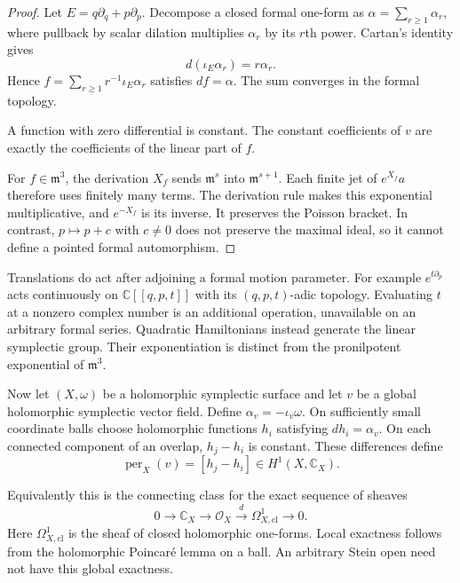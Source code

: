 \begin{proof}
Let $E=q\partial_q+p\partial_p$. Decompose a closed formal one-form
as $\alpha=\sum_{r\geq1}\alpha_r$, where pullback by scalar dilation
multiplies $\alpha_r$ by its $r$th power. Cartan's identity gives
\[
 d(\iota_E\alpha_r)=r\alpha_r.
\]
Hence $f=\sum_{r\geq1}r^{-1}\iota_E\alpha_r$ satisfies $df=\alpha$.
The sum converges in the formal topology.

A function with zero
differential is constant.
The constant coefficients of $v$ are
exactly the coefficients of the linear part of $f$.

For $f\in\mathfrak m^3$, the derivation $X_f$ sends
$\mathfrak m^s$ into $\mathfrak m^{s+1}$. Each finite jet of
$e^{X_f}a$ therefore uses finitely many terms. The derivation rule
makes this exponential multiplicative, and $e^{-X_f}$ is its
inverse. It preserves the Poisson bracket. In contrast,
$p\mapsto p+c$ with $c\ne0$ does not preserve the maximal ideal,
so it cannot define a pointed formal automorphism.
\end{proof}

Translations do act after adjoining a formal motion parameter.
For example $e^{t\partial_p}$ acts continuously on
$\mathbb C[[q,p,t]]$ with its $(q,p,t)$-adic topology.
Evaluating $t$ at a nonzero complex number is an additional
operation, unavailable on an arbitrary formal series. Quadratic
Hamiltonians instead generate the linear symplectic group. Their
exponentiation is distinct from the pronilpotent exponential of
$\mathfrak m^3$.

Now let $(X,\omega)$ be a holomorphic symplectic surface and let $v$
be a global holomorphic symplectic vector field. Define
$\alpha_v=-\iota_v\omega$. On sufficiently small coordinate balls
choose holomorphic functions $h_i$ satisfying $dh_i=\alpha_v$.
On each connected component of an overlap, $h_j-h_i$ is constant.
These differences define
\begin{equation}\label{mht:eq:hamiltonian-period}
 \operatorname{per}_X(v)=[h_j-h_i]\in H^1(X,\mathbb C_X).
\end{equation}

Equivalently this is the connecting class for the exact sequence
of sheaves
\[
 0\longrightarrow\mathbb C_X\longrightarrow\mathcal O_X
 \xrightarrow{d}\Omega^1_{X,\mathrm{cl}}\longrightarrow0.
\]
Here $\Omega^1_{X,\mathrm{cl}}$ is the sheaf of closed holomorphic
one-forms. Local exactness follows from the holomorphic Poincar\'e
lemma on a ball. An arbitrary Stein open need not have this global
exactness.

